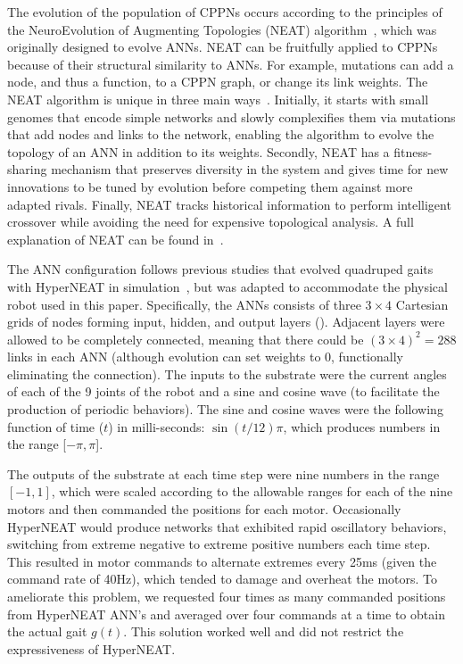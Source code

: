 The evolution of the population of CPPNs occurs according to the
principles of the NeuroEvolution of Augmenting Topologies (NEAT)
algorithm~\cite{stanley2002evolving}, which was originally designed to
evolve ANNs. NEAT can be fruitfully applied to CPPNs because of their
structural similarity to ANNs. For example, mutations can add a node,
and thus a function, to a CPPN graph, or change its link weights. The
NEAT algorithm is unique in three main
ways~\cite{stanley2002evolving}. Initially, it starts with small
genomes that encode simple networks and slowly complexifies them via
mutations that add nodes and links to the network, enabling the
algorithm to evolve the topology of an ANN in addition to its
weights. Secondly, NEAT has a fitness-sharing mechanism that preserves
diversity in the system and gives time for new innovations to be tuned
by evolution before competing them against more adapted
rivals. Finally, NEAT tracks historical information to perform
intelligent crossover while avoiding the need for expensive
topological analysis. A full explanation of NEAT can be found
in~\cite{stanley2002evolving}.
  
The ANN configuration follows previous studies that evolved quadruped
gaits with HyperNEAT in simulation~\cite{clune2011performance,
  clune2009evolving}, but was adapted to accommodate the physical robot used in this paper. Specifically, the ANNs consists of three $3 \times 4$
Cartesian grids of nodes forming input, hidden, and output
layers (). Adjacent layers were allowed to be completely connected, meaning that there
could be $(3 \times 4)^2= 288$ links in each ANN (although evolution can set weights to 0, functionally eliminating the connection). The inputs to the
substrate were the current angles of each of the 9 joints of the robot and a sine and cosine wave (to facilitate the
production of periodic behaviors). The sine and cosine waves were the
following function of time ($t$) in milli-seconds:
$\sin(t/12)\pi$, which produces numbers in the range [$-\pi, \pi$].


The outputs of the substrate at each time step were nine numbers in
the range $[-1,1]$, which were scaled according to the allowable
ranges for each of the nine motors and then commanded
the positions for each motor.  Occasionally HyperNEAT would produce networks that
exhibited rapid oscillatory behaviors, switching from extreme negative to extreme positive numbers each time step.  This resulted in motor
commands to alternate extremes every 25ms (given the command rate of
40Hz), which tended to damage and overheat the motors.  To ameliorate
this problem, we requested four times as many commanded
positions from HyperNEAT ANN's and averaged over four commands at a time to
obtain the actual gait $g(t)$.  This solution worked well and did not restrict the expressiveness of HyperNEAT.

